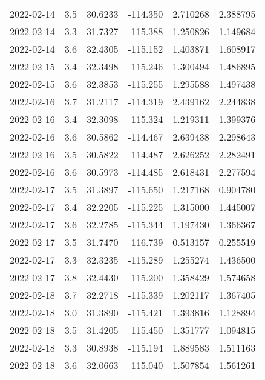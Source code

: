 \begin{tabular}{lrrrrr}
2022-02-14 &       3.5 &  30.6233 &  -114.350 &         2.710268 &         2.388795 \\
2022-02-14 &       3.3 &  31.7327 &  -115.388 &         1.250826 &         1.149684 \\
2022-02-14 &       3.6 &  32.4305 &  -115.152 &         1.403871 &         1.608917 \\
2022-02-15 &       3.4 &  32.3498 &  -115.246 &         1.300494 &         1.486895 \\
2022-02-15 &       3.6 &  32.3853 &  -115.255 &         1.295588 &         1.497438 \\
2022-02-16 &       3.7 &  31.2117 &  -114.319 &         2.439162 &         2.244838 \\
2022-02-16 &       3.4 &  32.3098 &  -115.324 &         1.219311 &         1.399376 \\
2022-02-16 &       3.6 &  30.5862 &  -114.467 &         2.639438 &         2.298643 \\
2022-02-16 &       3.5 &  30.5822 &  -114.487 &         2.626252 &         2.282491 \\
2022-02-16 &       3.6 &  30.5973 &  -114.485 &         2.618431 &         2.277594 \\
2022-02-17 &       3.5 &  31.3897 &  -115.650 &         1.217168 &         0.904780 \\
2022-02-17 &       3.4 &  32.2205 &  -115.225 &         1.315000 &         1.445007 \\
2022-02-17 &       3.6 &  32.2785 &  -115.344 &         1.197430 &         1.366367 \\
2022-02-17 &       3.5 &  31.7470 &  -116.739 &         0.513157 &         0.255519 \\
2022-02-17 &       3.3 &  32.3235 &  -115.289 &         1.255274 &         1.436500 \\
2022-02-17 &       3.8 &  32.4430 &  -115.200 &         1.358429 &         1.574658 \\
2022-02-18 &       3.7 &  32.2718 &  -115.339 &         1.202117 &         1.367405 \\
2022-02-18 &       3.0 &  31.3890 &  -115.421 &         1.393816 &         1.128894 \\
2022-02-18 &       3.5 &  31.4205 &  -115.450 &         1.351777 &         1.094815 \\
2022-02-18 &       3.3 &  30.8938 &  -115.194 &         1.889583 &         1.511163 \\
2022-02-18 &       3.6 &  32.0663 &  -115.040 &         1.507854 &         1.561261 \\

\end{tabular}
